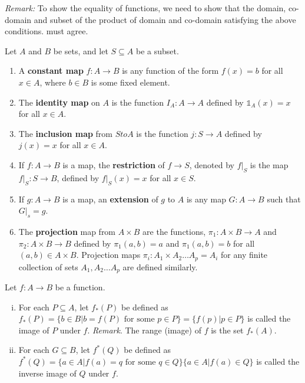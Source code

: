 \documentclass[a4paper,english,12pt]{article}
\begin{document}
\emph{Remark:} To show the equality of functions, we need to show that the domain, co-domain and subset of the product of domain and co-domain satisfying the 
above conditions. must agree.

\begin{defn}
Let $A$ and $B$ be sets, and let $S \subseteq A$ be a subset. 
\begin{enumerate}
 \item  A \textbf{constant map} $f: A \to B$ is any function of the form $f(x) = b$ for all $x \in A$, where $b \in B$ is some fixed element.
 
 \item  The \textbf{identity map} on $A$ is the function $I_{A}: A \to A$ defined by $\mathbb{1}_{A}(x) = x$ for all $x \in A$.

 \item  The \textbf{inclusion map} from $S to A$ is the function $j: S \to A$ defined by $j(x) = x$ for all $x \in A$.

 \item If $f: A \to B$ is a map, the \textbf{restriction} of $f \to S$, denoted by $f |_{S}$ is the map $f|_{S}: S \to B$, defined by $f|_{S}(x)= x$ for all 
 $x \in S$.

 \item  If $g: A \to B$ is a map, an \textbf{extension} of $g$ to $A$ is any map $G: A \to B$ such that $G|_{s} = g$.

 \item   The \textbf{projection} map from $A \times B$ are the functions, $\pi_{1}: A \times B \to A$ and $\pi_{2}: A \times B \to B$ defined by 
 $\pi_{1}(a, b) = a$ and $\pi_{1}(a, b) = b$ for all $(a,b) \in A \times B$. Projection maps $\pi_{i}: A_{1} \times A_{2} \dots A_{p} = A_{i}$ for 
 any finite collection of sets $A_{1}, A_{2} \dots A_{p}$ are defined similarly.

\end{enumerate}
\end{defn}


\begin{defn} 
 Let $f: A \to B$ be a function.
 \begin{enumerate} [i)]
  \item For each $P \subseteq A$, let $f_{*}(P)$ be defined as $f_{*}(P) = \{ b \in B | b = f(P) \text{ for some } p \in P \} = \{ f(p) | p \in P\}$ is called 
  the image of $P$ under $f$.
  \emph{Remark}. The range (image) of $f$ is the set $f_{*}(A)$.
  \item For each $G \subseteq B$, let $f^{*}(Q)$ be defined as $f^{*}(Q) = \{ a \in A | f(a) = q \text{ for some } q \in Q\} \{ a \in A | f(a) \in Q \}$ is called 
  the inverse image of $Q$ under $f$.
 \end{enumerate}
\end{defn}






\vspace{10cm}
\end{document}
